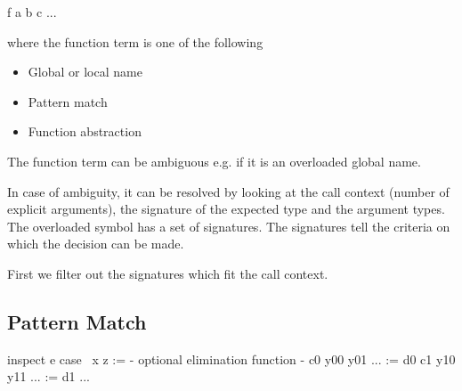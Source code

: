 \begin{alba}
    f a b c ...
\end{alba}
where the function term  is one of the following

\begin{itemize}
\item
    Global or local name
\item
    Pattern match
\item
    Function abstraction
\end{itemize}

The function term can be ambiguous e.g. if it is an overloaded global name.

In case of ambiguity, it can be resolved by looking at the call context (number
of explicit arguments), the signature of the expected type and the argument
types. The overloaded symbol has a set of signatures. The signatures tell the
criteria on which the decision can be made.

First we filter out the signatures which fit the call context.



\subsection{Pattern Match}


\begin{alba}
    inspect e case
        {\ {x} z :=
            {- optional elimination function -}
        }
        c0 y00 y01 ... := d0
        c1 y10 y11 ... := d1
        ...
\end{alba}






